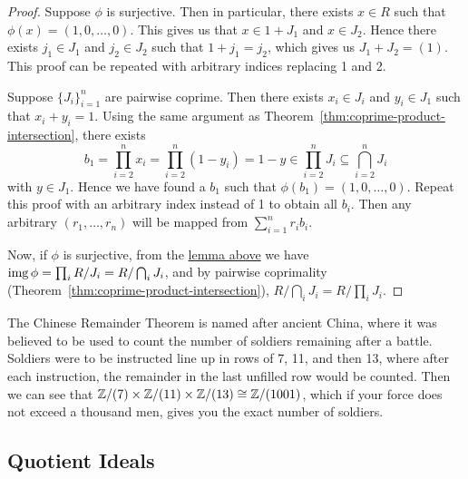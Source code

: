 \begin{proof}
    Suppose \(\phi\) is surjective.
    Then in particular, there exists \(x \in R\)
    such that \(\phi(x) = (1,0,\hdots,0)\).
    This gives us that \(x \in 1 + J_1\) and \(x \in J_2\).
    Hence there exists \(j_1 \in J_1\) and \(j_2 \in J_2\)
    such that \(1 + j_1 = j_2\),
    which gives us \(J_1 + J_2 = (1)\).
    This proof can be repeated with arbitrary indices replacing 1 and 2.

    Suppose \({\{J_i\}}_{i=1}^n\) are pairwise coprime.
    Then there exists \(x_i \in J_i\) and \(y_i \in J_1\)
    such that \(x_i + y_i = 1\).
    Using the same argument as Theorem~\ref{thm:coprime-product-intersection},
    there exists
    \begin{equation*}
        b_1 = \prod_{i=2}^n x_i = \prod_{i=2}^n (1-y_i) = 1 - y
        \in \prod_{i=2}^n J_i \subseteq \bigcap_{i=2}^n J_i
    \end{equation*}
    with \(y \in J_1\).
    Hence we have found a \(b_1\) such that \(\phi(b_1) = (1,0,\hdots,0)\).
    Repeat this proof with an arbitrary index instead of 1 to obtain all \(b_i\).
    Then any arbitrary \((r_1,\hdots,r_n)\)
    will be mapped from \(\sum_{i=1}^n r_i b_i\).

    Now, if \(\phi\) is surjective,
    from the \hyperref[lem:ideal-projections]{lemma above}
    we have \(\operatorname{img}\phi = \prod_i R/J_i = R/\bigcap_i J_i\),
    and by pairwise coprimality (Theorem~\ref{thm:coprime-product-intersection}),
    \(R/\bigcap_i J_i = R/\prod_i J_i\).
\end{proof}
\begin{remark}
    The Chinese Remainder Theorem is named after ancient China,
    where it was believed to be used to count the number of soldiers remaining after a battle.
    Soldiers were to be instructed line up in rows of 7, 11, and then 13,
    where after each instruction,
    the remainder in the last unfilled row would be counted.
    Then we can see that \(\mathbb{Z}/(7) \times \mathbb{Z}/(11) \times \mathbb{Z}/(13) \cong \mathbb{Z}/(1001)\),
    which if your force does not exceed a thousand men,
    gives you the exact number of soldiers.
\end{remark}

\subsection*{Quotient Ideals}

